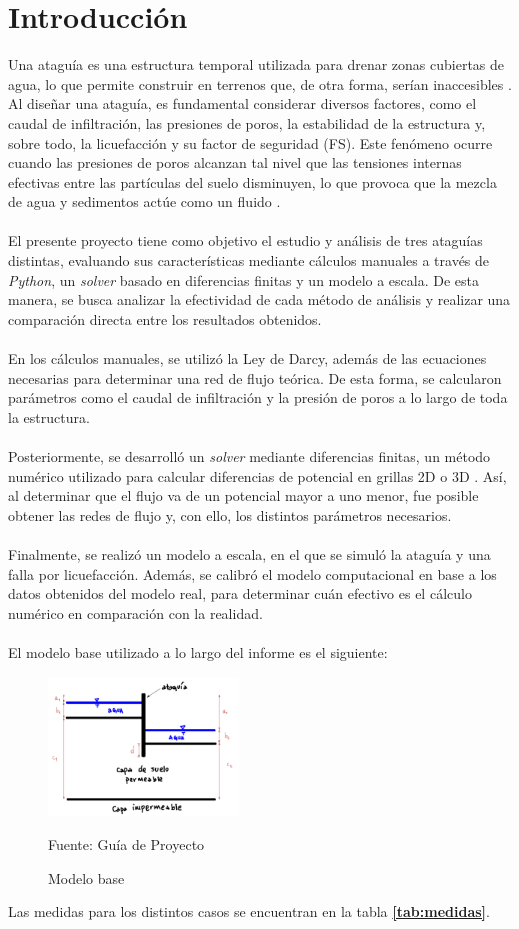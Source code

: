 \part{Introducción}

Una ataguía es una estructura temporal utilizada para drenar zonas cubiertas de agua, 
lo que permite construir en terrenos que, de otra forma, serían inaccesibles 
\citep{madanayaka2018}. Al diseñar una ataguía, es fundamental considerar diversos 
factores, como el caudal de infiltración, las presiones de poros, la estabilidad 
de la estructura y, sobre todo, la licuefacción y su factor de seguridad (FS).
 Este fenómeno ocurre cuando las presiones de poros alcanzan tal nivel que las 
 tensiones internas efectivas entre las partículas del suelo disminuyen, lo que provoca 
 que la mezcla de agua y sedimentos actúe como un fluido \citep{sumer2009}.
\\ \\
El presente proyecto tiene como objetivo el estudio y análisis de tres ataguías 
distintas, evaluando sus características mediante cálculos manuales a través de \textit{Python}, 
un \textit{solver} basado en diferencias finitas y un modelo a escala. De esta manera, se busca 
analizar la efectividad de cada método de análisis y realizar una comparación directa entre
 los resultados obtenidos.
\\ \\
En los cálculos manuales, se utilizó la Ley de Darcy, además de las ecuaciones necesarias
 para determinar una red de flujo teórica. De esta forma, se calcularon parámetros como el
  caudal de infiltración y la presión de poros a lo largo de toda la estructura.
\\ \\
Posteriormente, se desarrolló un \textit{solver} mediante diferencias finitas, un método numérico 
utilizado para calcular diferencias de potencial en grillas 2D o 3D \citep{zhang2005}. 
Así, al determinar que el flujo va de un potencial mayor a uno menor, fue posible obtener 
las redes de flujo y, con ello, los distintos parámetros necesarios.
\\ \\
Finalmente, se realizó un modelo a escala, en el que se simuló la ataguía y una falla
 por licuefacción. Además, se calibró el modelo computacional en base a los 
 datos obtenidos del modelo real, para determinar cuán efectivo es el cálculo numérico 
 en comparación con la realidad.
\\ \\
El modelo base utilizado a lo largo del informe es el siguiente:

\begin{figure}[H]
    \centering
    \includegraphics[width=0.45\textwidth]{FOTOS/modelo_base.png}
    \caption{Modelo base}
    Fuente: Guía de Proyecto
    \label{fig:modelo_base}
\end{figure}

Las medidas para los distintos casos se encuentran en la tabla \textbf{\ref{tab:medidas}}.
